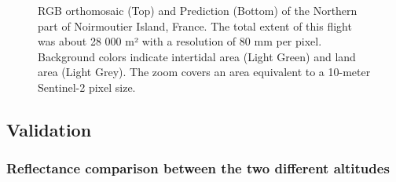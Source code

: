 \documentclass[
  number]{elsarticle}
\begin{document}
\label{cell-fig-Dike}
\begin{figure}[H]


\caption{\label{fig-Dike}RGB orthomosaic (Top) and Prediction (Bottom)
of the Northern part of Noirmoutier Island, France. The total extent of
this flight was about 28 000 m² with a resolution of 80 mm per pixel.
Background colors indicate intertidal area (Light Green) and land area
(Light Grey). The zoom covers an area equivalent to a 10-meter
Sentinel-2 pixel size.}

\end{figure}%

\subsection{Validation}\label{validation-1}

\subsubsection{Reflectance comparison between the two different
altitudes}\label{reflectance-comparison-between-the-two-different-altitudes}
\end{document}

